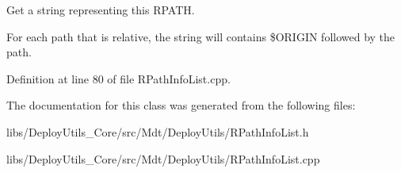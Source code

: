 Get a string representing this R\+P\+A\+TH. 

For each path that is relative, the string will contains \$\+O\+R\+I\+G\+IN followed by the path. 

Definition at line 80 of file R\+Path\+Info\+List.\+cpp.



The documentation for this class was generated from the following files\+:\begin{DoxyCompactItemize}
\item 
libs/\+Deploy\+Utils\+\_\+\+Core/src/\+Mdt/\+Deploy\+Utils/R\+Path\+Info\+List.\+h\item 
libs/\+Deploy\+Utils\+\_\+\+Core/src/\+Mdt/\+Deploy\+Utils/R\+Path\+Info\+List.\+cpp\end{DoxyCompactItemize}

